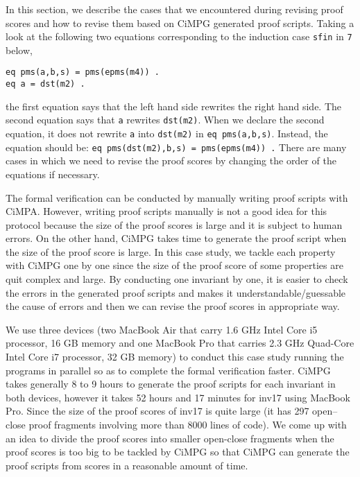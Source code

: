 \documentclass[a4paper,fleqn]{cas-dc}
\begin{document}
In this section, we describe the cases that we encountered during revising proof scores and how to revise them based on CiMPG generated proof scripts. Taking a look at the following two equations corresponding to the induction case \verb!sfin! in \verb!7! below,
\begin{small}
\begin{verbatim}
eq pms(a,b,s) = pms(epms(m4)) .
eq a = dst(m2) .
\end{verbatim}
\end{small}
the first equation says that the left hand side rewrites the right hand side. The second equation says that \verb!a! rewrites \verb!dst(m2)!. When we declare the second equation, it does not rewrite \verb!a! into \verb!dst(m2)! in \verb!eq pms(a,b,s)!. Instead, the equation should be: \verb!eq pms(dst(m2),b,s) = pms(epms(m4)) .! There are many cases in which we need to revise the proof scores by changing the order of the equations if necessary.

The formal verification can be conducted by manually writing proof  scripts with CiMPA. However, writing proof scripts manually is not a good idea for this protocol because the size of the proof scores is large and it is subject to human errors. On the other hand, CiMPG takes time to generate the proof script when the size of the proof score is large. In this case study, we tackle each property with CiMPG one by one since the size of the proof score of some properties are quit complex and large. By conducting one invariant by one, it is easier to check the errors in the generated proof scripts and makes it understandable/guessable the cause of errors and then we can revise the proof scores in appropriate way. 

We use three devices (two MacBook Air that carry 1.6 GHz Intel Core i5 processor, 16 GB memory and one MacBook Pro that carries 2.3 GHz Quad-Core Intel Core i7 processor, 32 GB memory) to conduct this case study running the programs in parallel so as to complete the formal verification faster. CiMPG takes generally 8 to 9 hours to generate the proof scripts for each invariant in both devices, however it takes 52 hours and 17 minutes for inv17 using MacBook Pro. Since the size of the proof scores of inv17 is quite large (it has 297 open–close proof fragments involving more than 8000 lines of code). We come up with an idea to divide the proof scores into smaller  open-close fragments when the proof scores is too big to be tackled by CiMPG so that CiMPG can generate the proof scripts from scores in a reasonable amount of time.
\end{document}
